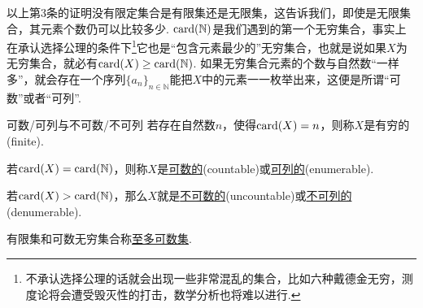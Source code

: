 \documentclass[main.tex]{subfiles}
\begin{document}
以上第3条的证明没有限定集合是有限集还是无限集，这告诉我们，即使是无限集合，其元素个数仍可以比较多少. \({\rm card}(\mathbb{N})\)是我们遇到的第一个无穷集合，事实上在承认选择公理的条件下\footnote{不承认选择公理的话就会出现一些非常混乱的集合，比如六种戴德金无穷，测度论将会遭受毁灭性的打击，数学分析也将难以进行.}它也是“包含元素最少的”无穷集合，也就是说如果\(X\)为无穷集合，就必有\({\rm card}(X)\geq{\rm card}(\mathbb{N})\). 如果无穷集合元素的个数与自然数“一样多”，就会存在一个序列\(\{a_n\}_{n\in\mathbb{N}}\)能把\(X\)中的元素一一枚举出来，这便是所谓“可数”或者“可列”.

\begin{definition}{可数/可列与不可数/不可列}
    若存在自然数\(n\)，使得\({\rm card}(X)=n\)，则称\(X\)是有穷的(finite).
    \par
    若\({\rm card}(X)={\rm card}(\mathbb{N})\)，则称\(X\)是\uline{可数的}(countable)或\uline{可列的}(enumerable). 
    \par
    若\({\rm card}(X)>{\rm card}(\mathbb{N})\)，那么\(X\)就是\uline{不可数的}(uncountable)或\uline{不可列的}(denumerable).
    \par
    有限集和可数无穷集合称\uline{至多可数集}.
\end{definition}
\end{document}
